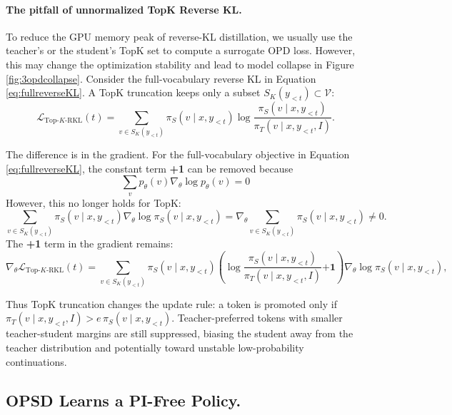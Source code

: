\paragraph{The pitfall of unnormalized TopK Reverse KL.}
\label{curse_topk}

To reduce the GPU memory peak of reverse-KL distillation, we usually use the teacher's or the student's TopK set to compute a surrogate OPD loss. However, this may change the optimization stability and lead to model collapse in Figure \ref{fig:3opdcollapse}. Consider the full-vocabulary reverse KL in Equation \ref{eq:fullreverseKL}. A TopK truncation keeps only a subset $S_K(y_{<t})\subset\mathcal V$:
\begin{equation}
\mathcal L_{\mathrm{Top}\text{-}K\text{-}\mathrm{RKL}}(t)
=
\sum_{v\in S_K(y_{<t})}
\pi_S(v\mid x, y_{<t})\log\frac{\pi_S(v\mid x,y_{<t})}{\pi_T(v\mid x,y_{<t},I)}.
\label{eq:topkrevKL}
\end{equation}

The difference is in the gradient. For the full-vocabulary objective in Equation \ref{eq:fullreverseKL},
the constant term \textbf{+1} can be removed because
\begin{equation}
\sum_v p_\theta(v)\nabla_\theta\log p_\theta(v)  = 0
\end{equation}
However, this no longer holds for TopK:
\begin{equation}   
\sum_{v\in S_K(y_{<t})}\pi_S(v\mid x,y_{<t})\nabla_\theta \log \pi_S(v\mid x,y_{<t})
=
\nabla_\theta \sum_{v\in S_K(y_{<t})}\pi_S(v\mid x,y_{<t})
\neq 0.
\end{equation}
The \textbf{+1} term in the gradient remains:
\begin{equation} 
\nabla_\theta \mathcal L_{\mathrm{Top}\text{-}K\text{-}\mathrm{RKL}}(t)
=
\sum_{v\in S_K(y_{<t})}
\pi_S(v\mid x,y_{<t})
\left(
\log\frac{\pi_S(v\mid x,y_{<t})}{\pi_T(v\mid x,y_{<t},I)}\textbf{+1}
\right)
\nabla_\theta \log \pi_S(v\mid x,y_{<t}),
\end{equation}


Thus TopK truncation changes the update rule: a token is promoted only if
$
\pi_T(v \mid x,y_{<t},I) > e\,\pi_S(v \mid x,y_{<t}).
$
Teacher-preferred tokens with smaller teacher-student margins are still suppressed, biasing the student away from the teacher distribution and potentially toward unstable low-probability continuations.




\subsection{OPSD Learns a PI-Free Policy.}

